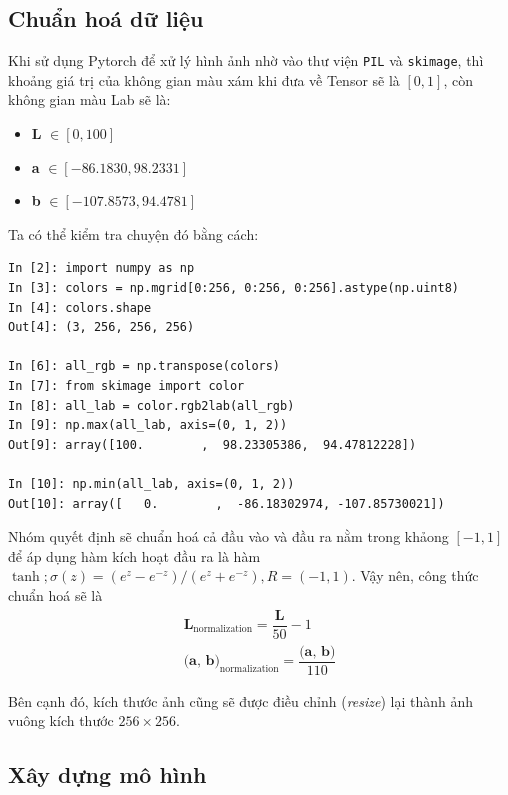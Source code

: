 \documentclass[a4paper]{article}
\begin{document}
\subsection{Chuẩn hoá dữ liệu}\label{normalization}
\noindent
Khi sử dụng Pytorch để xử lý hình ảnh nhờ vào thư viện \texttt{PIL} và \texttt{skimage}, thì khoảng giá trị của không gian màu xám khi đưa về Tensor sẽ là $[0, 1]$, còn không gian màu Lab sẽ là:

\begin{itemize}
    \item \textbf{L} $\in [0, 100]$
    
    \item \textbf{a} $\in [-86.1830, 98.2331]$
    
    \item \textbf{b} $\in [-107.8573, 94.4781]$
\end{itemize}

\noindent
Ta có thể kiểm tra chuyện đó bằng cách:
\begin{lstlisting}
In [2]: import numpy as np
In [3]: colors = np.mgrid[0:256, 0:256, 0:256].astype(np.uint8)
In [4]: colors.shape
Out[4]: (3, 256, 256, 256)

In [6]: all_rgb = np.transpose(colors)
In [7]: from skimage import color
In [8]: all_lab = color.rgb2lab(all_rgb)
In [9]: np.max(all_lab, axis=(0, 1, 2))
Out[9]: array([100.        ,  98.23305386,  94.47812228])

In [10]: np.min(all_lab, axis=(0, 1, 2))
Out[10]: array([   0.        ,  -86.18302974, -107.85730021])
\end{lstlisting}

\noindent
Nhóm quyết định sẽ chuẩn hoá cả đầu vào và đầu ra nằm trong khảong $[-1, 1]$ để áp dụng hàm kích hoạt đầu ra là hàm $\tanh; \sigma(z) = \left(e^z-e^{-z}\right)/\left(e^z+e^{-z}\right), R = (-1, 1)$. Vậy nên, công thức chuẩn hoá sẽ là
\begin{align*}
    \textbf{L}_{\text{normalization}} = \dfrac{\textbf{L}}{50} - 1\\
    \textbf{(a, b)}_{\text{normalization}} = \dfrac{\textbf{(a, b)}}{110}
\end{align*}

\noindent
Bên cạnh đó, kích thước ảnh cũng sẽ được điều chỉnh (\textit{resize}) lại thành ảnh vuông kích thước $256\times 256$.

\subsection{Xây dựng mô hình}\label{buildmodel}
\end{document}
